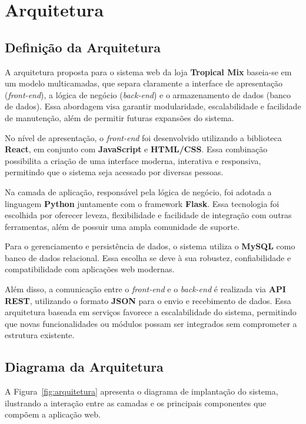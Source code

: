 \section{Arquitetura}

\subsection{Definição da Arquitetura}

A arquitetura proposta para o sistema web da loja \textbf{Tropical Mix} baseia-se em um modelo multicamadas, que separa claramente a interface de apresentação (\textit{front-end}), a lógica de negócio (\textit{back-end}) e o armazenamento de dados (banco de dados). Essa abordagem visa garantir modularidade, escalabilidade e facilidade de manutenção, além de permitir futuras expansões do sistema.

No nível de apresentação, o \textit{front-end} foi desenvolvido utilizando a biblioteca \textbf{React}, em conjunto com \textbf{JavaScript} e \textbf{HTML/CSS}. Essa combinação possibilita a criação de uma interface moderna, interativa e responsiva, permitindo que o sistema seja acessado por diversas pessoas.

Na camada de aplicação, responsável pela lógica de negócio, foi adotada a linguagem \textbf{Python} juntamente com o framework \textbf{Flask}. Essa tecnologia foi escolhida por oferecer leveza, flexibilidade e facilidade de integração com outras ferramentas, além de possuir uma ampla comunidade de suporte.

Para o gerenciamento e persistência de dados, o sistema utiliza o \textbf{MySQL} como banco de dados relacional. Essa escolha se deve à sua robustez, confiabilidade e compatibilidade com aplicações web modernas.

Além disso, a comunicação entre o \textit{front-end} e o \textit{back-end} é realizada via \textbf{API REST}, utilizando o formato \textbf{JSON} para o envio e recebimento de dados. Essa arquitetura baseada em serviços favorece a escalabilidade do sistema, permitindo que novas funcionalidades ou módulos possam ser integrados sem comprometer a estrutura existente.

\subsection{Diagrama da Arquitetura}

A Figura~\ref{fig:arquitetura} apresenta o diagrama de implantação do sistema, ilustrando a interação entre as camadas e os principais componentes que compõem a aplicação web.

